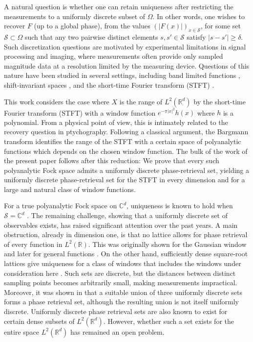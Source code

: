 \documentclass[11pt]{amsart}
\newcommand{\C}{\mathbb C}
\newcommand{\R}{\mathbb R}
\begin{document}
A natural question is whether one can retain uniqueness after restricting the measurements to a uniformly discrete subset of $\Omega$. In other words, one wishes to recover $F$ (up to a global phase), from the values $(|F(x)|)_{x\in \mathcal S}$,  for some set $\mathcal S\subset \Omega$ such that any two pairwise distinct elements $s,s' \in \mathcal{S}$ satisfy $|s-s'| \geq \delta$. Such discretization questions are motivated by experimental limitations in signal processing and imaging, where measurements often provide only sampled magnitude data \cite{GrohsKoppensteinerRathmair2020} at a resolution limited by the measuring device. Questions of this nature have been studied in several settings, including band limited functions \cite{alaifari2021uniqueness,alaifari2017reconstructing,Thakur2011}, shift-invariant spaces \cite{ChenChengSunWang2020,grochenig2020phase,romero2021sign}, and the short-time Fourier transform (STFT) \cite{alaifari2025multiwindow,chen2025sampling,GrohsLiehr2022,GrohsLiehr2025}.


This work considers the case where $X$ is the range of $L^2(\mathbb R^d)$ by the short-time Fourier transform (STFT) with a window function $e^{-\pi |x|^2} h(x)$ where $h$ is a polynomial. From a physical point of view, this is intimately related to the recovery question in ptychography. Following a classical argument, the Bargmann transform identifies the range of the STFT with a certain space of polyanalytic functions which depends on the chosen window function. The bulk of the work of the present paper follows after this reduction: We prove that every such polyanalytic Fock space admits a uniformly discrete phase-retrieval set, yielding a uniformly discrete phase-retrieval set for the STFT in every dimension and for a large and natural class of window functions.

For a true polyanalytic Fock space on $\C^d$, uniqueness is known to hold when $\mathcal S = \C^d$ \cite{AlaifariWellershoff2021}. The remaining challenge, showing that a uniformly discrete set of observables exists, has raised significant attention over the past years. A main obstruction, already in dimension one, is that no lattice allows for phase retrieval of every function in $L^2(\R)$. This was originally shown for the Gaussian window \cite{AlaifariWellershoff2022} and later for general functions \cite{GrohsLiehr2022}. On the other hand, sufficiently dense square-root lattices give uniqueness for a class of windows that includes the windows under consideration here \cite{GrohsLiehr2025}. Such sets are discrete, but the distances between distinct sampling points becomes arbitrarily small, making measurements impractical. Moreover, it was shown in \cite{grohs2025phase} that a suitable union of three uniformly discrete sets forms a phase retrieval set, although the resulting union is not itself uniformly discrete. Uniformly discrete phase retrieval sets are also known to exist for certain dense subsets of $L^2(\R^d)$. However, whether such a set exists for the entire space $L^2(\R^d)$ has remained an open problem.
\end{document}
